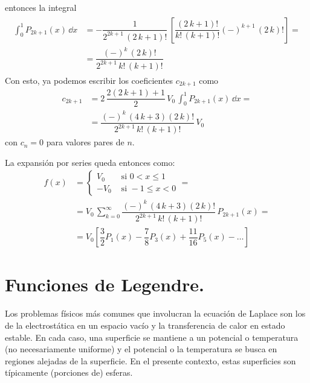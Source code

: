 entonces la integral
\begin{align}
\begin{aligned}
\int_{0}^{1} P_{2k+1} (x) \, \dd x &= - \dfrac{1}{2^{2k+1} \, (2 \, k + 1)!} \, \left[ \dfrac{(2 \, k + 1)!}{k! \, (k + 1)!} (-)^{k+1} \, (2 \, k)! \right] = \\
&= \dfrac{(-)^{k} \, (2 \, k )!}{2^{2k+1} \, k! \, (k+1)!}
\end{aligned}
\label{eq:ecuacion_26_49}
\end{align}
Con esto, ya podemos escribir los coeficientes $c_{2k+1}$ como
\begin{align*}
c_{2k+1} &=  2 \, \dfrac{2 (2 \, k + 1) + 1}{2} \, V_{0} \, \int_{0}^{1} P_{2k+1} (x) \, \dd x = \\
&= \dfrac{(-)^{k} \, (4 \, k + 3)(2 \, k)!}{2^{2k+1} \,k! \, (k + 1)!} \, V_{0}
\end{align*}
con $c_{n}=0$ para valores pares de $n$.
\par
La expansión por series queda entonces como:
\begin{align*}
f(x) &= \begin{cases}
V_{0} & \mbox{ si } 0 < x \leq 1 \\
-V_{0} & \mbox { si } -1 \leq x < 0
\end{cases} = \\
&= V_{0} \, \sum_{k=0}^{\infty} \dfrac{(-)^{k} \, (4 \, k + 3)(2 \, k)!}{2^{2k+1} \,k! \, (k + 1)!} \, P_{2k+1} (x) = \\
&= V_{0} \left[ \dfrac{3}{2} P_{1} (x) - \dfrac{7}{8} P_{3} (x) + \dfrac{11}{16} P_{5} (x) - \ldots \right]
\end{align*}
\section{Funciones de Legendre.}
Los problemas físicos más comunes que involucran la ecuación de Laplace son los de la electrostática en un espacio vacío y la transferencia de calor en estado estable. En cada caso, una superficie se mantiene a un potencial o temperatura (no necesariamente uniforme) y el potencial o la temperatura se busca en regiones alejadas de la superficie. En el presente contexto, estas superficies son típicamente (porciones de) esferas.
